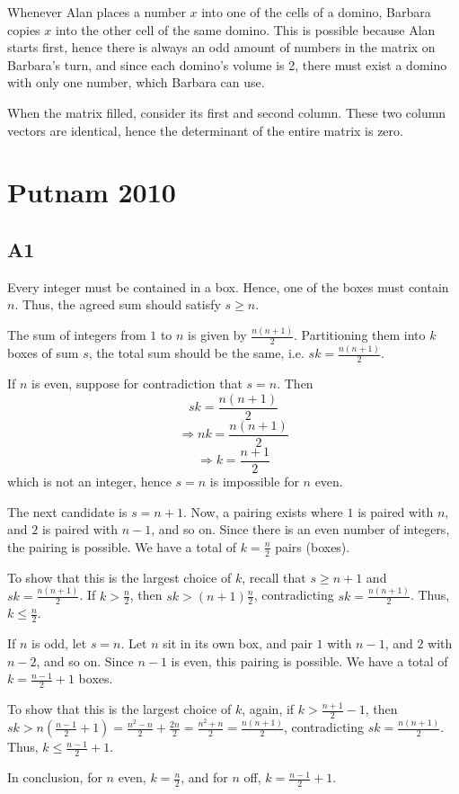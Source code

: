 \documentclass{book}
\begin{document}
Whenever Alan places a number $x$ into one of the cells of a domino, Barbara copies $x$ into the other cell of the same domino. This is possible because Alan starts first, hence there is always an odd amount of numbers in the matrix on Barbara's turn, and since each domino's volume is 2, there must exist a domino with only one number, which Barbara can use.

When the matrix filled, consider its first and second column. These two column vectors are identical, hence the determinant of the entire matrix is zero.

\chapter{Putnam 2010}

\section*{A1}
Every integer must be contained in a box. Hence, one of the boxes must contain $n$. Thus, the agreed sum should satisfy $s \geq n$.

The sum of integers from $1$ to $n$ is given by $\frac{n(n + 1)}{2}$. Partitioning them into $k$ boxes of sum $s$, the total sum should be the same, i.e. $sk = \frac{n(n + 1)}{2}$.

If $n$ is even, suppose for contradiction that $s = n$. Then
$$sk = \frac{n(n + 1)}{2}$$
$$\Rightarrow nk = \frac{n(n + 1)}{2}$$
$$\Rightarrow k = \frac{n + 1}{2}$$
which is not an integer, hence $s = n$ is impossible for $n$ even.

The next candidate is $s = n + 1$. Now, a pairing exists where $1$ is paired with $n$, and $2$ is paired with $n - 1$, and so on. Since there is an even number of integers, the pairing is possible. We have a total of $k = \frac{n}{2}$ pairs (boxes).

To show that this is the largest choice of $k$, recall that $s \geq n + 1$ and $sk = \frac{n(n + 1)}{2}$. If $k > \frac{n}{2}$, then $sk > (n + 1)\frac{n}{2}$, contradicting $sk = \frac{n(n + 1)}{2}$. Thus, $k \leq \frac{n}{2}$.

If $n$ is odd, let $s = n$. Let $n$ sit in its own box, and pair $1$ with $n - 1$, and $2$ with $n - 2$, and so on. Since $n - 1$ is even, this pairing is possible. We have a total of $k = \frac{n - 1}{2} + 1$ boxes.

To show that this is the largest choice of $k$, again, if $k > \frac{n + 1}{2} - 1$, then $sk > n \left( \frac{n - 1}{2} + 1 \right) = \frac{n^2 - n}{2} + \frac{2n}{2} = \frac{n^2 + n}{2} = \frac{n(n + 1)}{2}$, contradicting $sk = \frac{n(n + 1)}{2}$. Thus, $k \leq \frac{n - 1}{2} + 1$.

In conclusion, for $n$ even, $k = \frac{n}{2}$, and for $n$ off, $k = \frac{n - 1}{2} + 1$.
\end{document}
